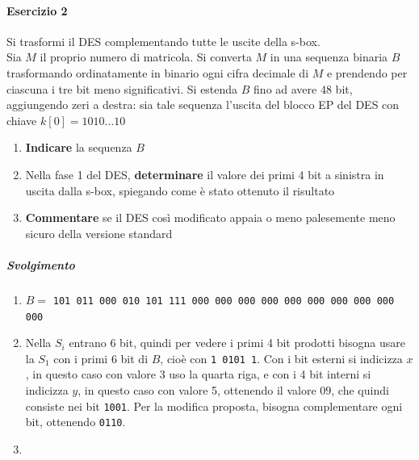 \documentclass[10pt]{book}
\begin{document}
\paragraph{Esercizio 2} Si trasformi il DES complementando tutte le uscite della s-box.\\
Sia $M$ il proprio numero di matricola. Si converta $M$ in una sequenza binaria $B$ trasformando ordinatamente in binario ogni cifra decimale di $M$ e prendendo per ciascuna i tre bit meno significativi. Si estenda $B$ fino ad avere 48 bit, aggiungendo zeri a destra: sia tale sequenza l'uscita del blocco EP del DES con chiave $k[0] = 1010\ldots10$
\begin{enumerate}
	\item \textbf{Indicare} la sequenza $B$
	\item Nella fase 1 del DES, \textbf{determinare} il valore dei primi 4 bit a sinistra in uscita dalla s-box, spiegando come è stato ottenuto il risultato
	\item \textbf{Commentare} se il DES così modificato appaia o meno palesemente meno sicuro della versione standard
\end{enumerate}
\subparagraph{Svolgimento}
\begin{enumerate}
	\item $B =$ \texttt{101 011 000 010 101 111 000 000 000 000 000 000 000 000 000 000}
	\item Nella $S_i$ entrano 6 bit, quindi per vedere i primi 4 bit prodotti bisogna usare la $S_1$ con i primi 6 bit di $B$, cioè con \texttt{1 0101 1}. Con i bit esterni si indicizza $x$, in questo caso con valore 3 uso la quarta riga, e con i 4 bit interni si indicizza $y$, in questo caso con valore 5, ottenendo il valore $09$, che quindi consiste nei bit \texttt{1001}. Per la modifica proposta, bisogna complementare ogni bit, ottenendo \texttt{0110}.
	\item
\end{enumerate}
\pagebreak
\end{document}
